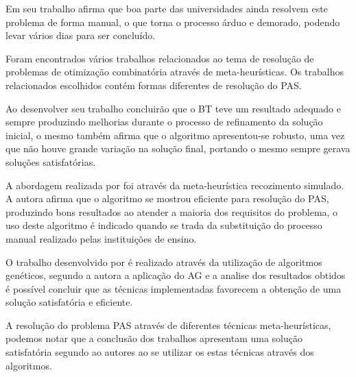 \documentclass{abntpuc}
\begin{document}
Em seu trabalho \cite{souza2000} afirma que boa parte das universidades ainda resolvem este problema de forma manual, o que torna o processo árduo e demorado, podendo levar vários dias para ser concluído.\par




Foram encontrados vários trabalhos relacionados ao tema de resolução de problemas de otimização combinatória através de meta-heurísticas. Os trabalhos relacionados escolhidos contém formas diferentes de resolução do PAS.\par

Ao desenvolver seu trabalho \cite{subramanian2006aplicaccao} concluirão que o BT teve um resultado adequado e sempre produzindo melhorias durante o processo de refinamento da solução inicial, o mesmo também afirma que o algoritmo apresentou-se robusto, uma vez que não houve grande variação na solução final, portando o mesmo sempre gerava soluções satisfatórias.

A abordagem realizada por \cite{silva2005estudo} foi através da meta-heurística recozimento simulado. A autora afirma que o algoritmo se mostrou eficiente para resolução do PAS, produzindo bons resultados ao atender a maioria dos requisitos do problema, o uso deste algoritmo é indicado quando se trada da substituição do processo manual realizado pelas instituições de ensino.

O trabalho desenvolvido por \cite{hamawaki2011geraccao} é realizado através da utilização de algoritmos genéticos, segundo a autora a aplicação do AG e a analise dos resultados obtidos é possível concluir que as técnicas implementadas favorecem a obtenção de uma solução satisfatória e eficiente.

A resolução do problema PAS através de diferentes técnicas meta-heurísticas, podemos notar que a conclusão dos trabalhos apresentam uma solução satisfatória segundo ao autores ao se utilizar os estas técnicas através dos algoritmos.\par







\end{document}
